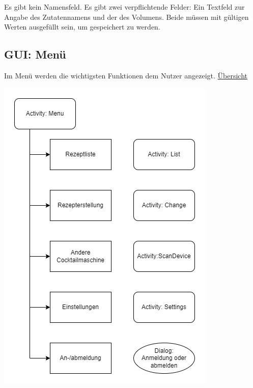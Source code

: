 Es gibt kein Namensfeld. Es gibt zwei verpflichtende Felder: Ein Textfeld zur Angabe des Zutatennamens und der des Volumens. Beide müssen mit gültigen Werten ausgefüllt sein, um gespeichert zu werden.


\subsection{GUI: Menü}

Im Menü werden die wichtigsten Funktionen dem Nutzer angezeigt.
\hyperref[table:menu]{Übersicht}

\includegraphics[scale=0.65]{Menu.png}


